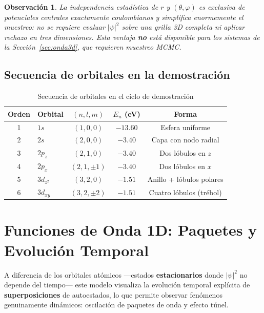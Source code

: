 \documentclass[12pt, a4paper]{article}
\newtheorem{observacion}{Observación}[section]
\begin{document}
\begin{observacion}
La independencia estadística de $r$ y $(\theta,\varphi)$ es exclusiva
de potenciales centrales exactamente coulombianos y simplifica
enormemente el muestreo: no se requiere evaluar $|\psi|^2$ sobre una
grilla 3D completa ni aplicar rechazo en tres dimensiones. Esta
ventaja \textbf{no} está disponible para los sistemas de la
Sección~\ref{sec:onda3d}, que requieren muestreo MCMC.
\end{observacion}

\subsection{Secuencia de orbitales en la demostración}

\begin{table}[H]
  \centering
  \caption{Secuencia de orbitales en el ciclo de demostración}
  \begin{tabular}{clccc}
    \toprule
    Orden & Orbital & $(n,l,m)$ & $E_n$ (eV) & Forma \\
    \midrule
    1 & $1s$     & $(1,0,0)$     & $-13.60$ & Esfera uniforme \\
    2 & $2s$     & $(2,0,0)$     & $-3.40$  & Capa con nodo radial \\
    3 & $2p_z$   & $(2,1,0)$     & $-3.40$  & Dos lóbulos en $z$ \\
    4 & $2p_x$   & $(2,1,\pm1)$  & $-3.40$  & Dos lóbulos en $x$ \\
    5 & $3d_{z^2}$ & $(3,2,0)$   & $-1.51$  & Anillo + lóbulos polares \\
    6 & $3d_{xy}$  & $(3,2,\pm2)$ & $-1.51$ & Cuatro lóbulos (trébol) \\
    \bottomrule
  \end{tabular}
  \label{tab:secuencia_orbitales}
\end{table}

\section{Funciones de Onda 1D: Paquetes y Evolución Temporal}
\label{sec:onda1d}

A diferencia de los orbitales atómicos —estados \textbf{estacionarios}
donde $|\psi|^2$ no depende del tiempo— este modelo visualiza la
evolución temporal explícita de \textbf{superposiciones} de
autoestados, lo que permite observar fenómenos genuinamente dinámicos:
oscilación de paquetes de onda y efecto túnel.
\end{document}
